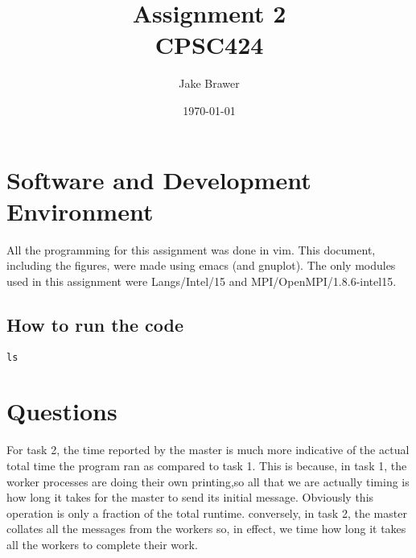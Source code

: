 \documentclass[11pt]{article}
\author{Jake Brawer}
\date{\today}
\title{Assignment 2\\\medskip
\large CPSC424}
\begin{document}
\maketitle

\section{Software and Development Environment}
\label{sec:org07ac9ac}
All the programming for this assignment was done in vim. This document, including the figures, were made using emacs (and gnuplot). The only modules used in this assignment were Langs/Intel/15 and MPI/OpenMPI/1.8.6-intel15.

\subsection{How to run the code}
\label{sec:orgb782035}

\begin{verbatim}
ls
\end{verbatim}

\section{Questions}
\label{sec:org678ab0a}
For task 2, the time reported by the master is much more indicative of the actual total time the program ran as compared to task 1. This is because, in task 1, the worker processes are doing their own printing,so all that we are actually timing is how long it takes for the master to send its initial message. Obviously this operation is only a fraction of the total runtime. conversely, in task 2, the master collates all the messages from the workers so, in effect, we time how long it takes all the workers to complete their work. 
\end{document}
